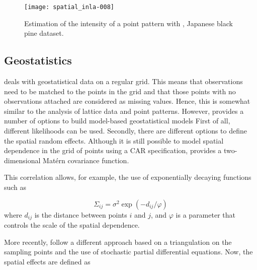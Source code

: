 \documentclass[article]{jss}
\begin{document}
\begin{figure}[h]
\begin{center}
\texttt{[image: spatial\_inla-008]}
\end{center}
\caption{Estimation of the intensity of a point pattern with , 
Japanese black pine dataset.}
\label{fig:sppa}
\end{figure}



\subsection{Geostatistics}


 deals with geostatistical data on a regular grid. This means
that observations need to be matched to the points in the grid and that those
points with no observations attached are considered as missing values.
Hence, this is somewhat similar to the analysis of lattice data and point
patterns. However,  provides a number of options to build 
model-based geostatistical models \citet{DiggleRibeiro:2007} First
of all, different likelihoods can be used. Secondly, there are different
options to define the spatial random effects. Although it is still possible
to model spatial dependence in the grid of points using a CAR specification,
 provides a two-dimensional Mat\'ern covariance function. 


This correlation allows, for example, the use of exponentially decaying
functions such as 

$$
\Sigma_{ij} = \sigma^2 \exp(-d_{ij}/\varphi)
$$
\noindent
where $d_{ij}$ is the distance between points $i$ and $j$, and $\varphi$
is a parameter that controls the scale of the spatial dependence.


%
%
%



More recently, \citet{Lindgren:2011} follow a different approach based on
a triangulation on the sampling points and the use of stochastic partial
differential equations. Now, the spatial effects are defined as
\end{document}
